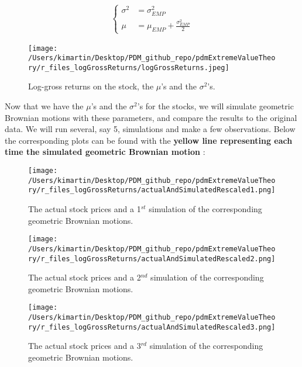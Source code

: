 \begin{equation}
\begin{alignat*}{2}
\begin{cases} \sigma^2 &= \sigma_{EMP}^2\\
\mu &= \mu_{EMP} + \frac{\sigma_{EMP}^2}{2} \end{cases}
\end{alignat*}
\end{equation}\newline	
\newpage
\begin{figure}[h!]
	\centering
		\texttt{[image: /Users/kimartin/Desktop/PDM\_github\_repo/pdmExtremeValueTheory/r\_files\_logGrossReturns/logGrossReturns.jpeg]}
		\caption{Log-gross returns on the stock, the $\mu$'s and the $\sigma^2$'s.}
		\label{fig:LogGrossReturns}
\end{figure}
Now that we have the $\mu$'s and the $\sigma^2$'s for the stocks, we will simulate geometric Brownian motions with these parameters, and compare the results to the original data. We will run several, say 5, simulations and make a few observations. Below the corresponding plots can be found with the \textbf{yellow line representing each time the simulated geometric Brownian motion} :
\begin{figure}[h!]
	\centering
	\texttt{[image: /Users/kimartin/Desktop/PDM\_github\_repo/pdmExtremeValueTheory/r\_files\_logGrossReturns/actualAndSimulatedRescaled1.png]}
	\caption{The actual stock prices and a 1$^{st}$ simulation of the corresponding geometric Brownian motions.}
	\label{fig:ActualAndSimulatedGeomBMs1}
\end{figure}
\newpage
\begin{figure}[h!]
	\centering
	\texttt{[image: /Users/kimartin/Desktop/PDM\_github\_repo/pdmExtremeValueTheory/r\_files\_logGrossReturns/actualAndSimulatedRescaled2.png]}
	\caption{The actual stock prices and a 2$^{nd}$ simulation of the corresponding geometric Brownian motions.}
	\label{fig:ActualAndManySimulatedGeomBMs2}
\end{figure}
\newpage
\begin{figure}[h!]
	\centering
	\texttt{[image: /Users/kimartin/Desktop/PDM\_github\_repo/pdmExtremeValueTheory/r\_files\_logGrossReturns/actualAndSimulatedRescaled3.png]}
	\caption{The actual stock prices and a 3$^{rd}$ simulation of the corresponding geometric Brownian motions.}
	\label{fig:ActualAndManySimulatedGeomBMs3}
\end{figure}
